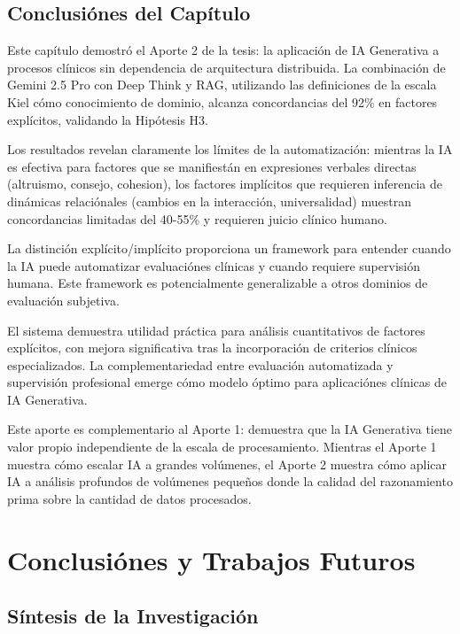 \documentclass[12pt,a4paper,twoside]{book}
\begin{document}
\section{Conclusiónes del Capítulo}

Este capítulo demostró el Aporte 2 de la tesis: la aplicación de IA Generativa a procesos clínicos sin dependencia de arquitectura distribuida. La combinación de Gemini 2.5 Pro con Deep Think y RAG, utilizando las definiciones de la escala Kiel cómo conocimiento de dominio, alcanza concordancias del 92\% en factores explícitos, validando la Hipótesis H3.

Los resultados revelan claramente los límites de la automatización: mientras la IA es efectiva para factores que se manifiestán en expresiones verbales directas (altruismo, consejo, cohesion), los factores implícitos que requieren inferencia de dinámicas relaciónales (cambios en la interacción, universalidad) muestran concordancias limitadas del 40-55\% y requieren juicio clínico humano.

La distinción explícito/implícito proporciona un framework para entender cuando la IA puede automatizar evaluaciónes clínicas y cuando requiere supervisión humana. Este framework es potencialmente generalizable a otros dominios de evaluación subjetiva.

El sistema demuestra utilidad práctica para análisis cuantitativos de factores explícitos, con mejora significativa tras la incorporación de criterios clínicos especializados. La complementariedad entre evaluación automatizada y supervisión profesional emerge cómo modelo óptimo para aplicaciónes clínicas de IA Generativa.

Este aporte es complementario al Aporte 1: demuestra que la IA Generativa tiene valor propio independiente de la escala de procesamiento. Mientras el Aporte 1 muestra cómo escalar IA a grandes volúmenes, el Aporte 2 muestra cómo aplicar IA a análisis profundos de volúmenes pequeños donde la calidad del razonamiento prima sobre la cantidad de datos procesados.
\chapter{Conclusiónes y Trabajos Futuros}
\label{cap:conclusiones}

\section{Síntesis de la Investigación}
\end{document}
